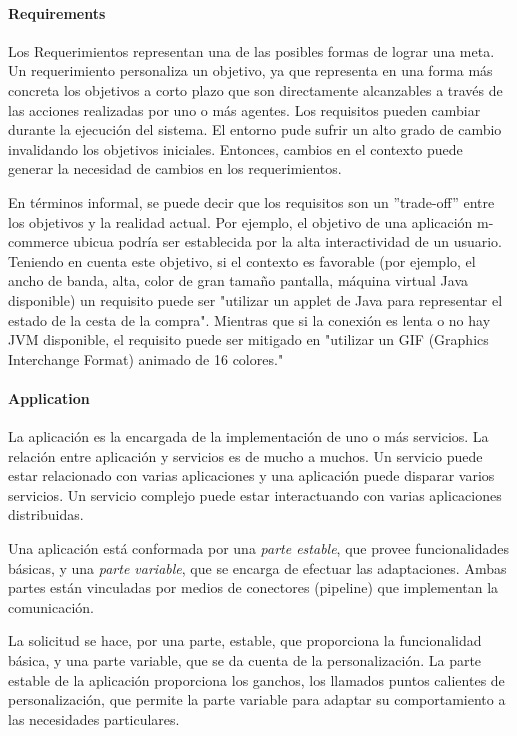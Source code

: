 \paragraph{Requirements}

Los Requerimientos representan una de las posibles formas de lograr una meta. Un requerimiento personaliza un objetivo, ya
que representa en una forma más concreta los objetivos a corto plazo que son directamente alcanzables a través de las acciones realizadas por uno o más agentes. Los requisitos pueden cambiar durante la ejecución del sistema. El entorno pude sufrir un alto grado de cambio invalidando los objetivos iniciales. Entonces, cambios en el contexto puede generar la necesidad de cambios en los requerimientos.

En términos informal, se puede decir que los requisitos son un ''trade-off'' entre los  objetivos y la realidad actual. Por ejemplo, el objetivo de una aplicación m-commerce ubicua podría ser establecida por la alta interactividad de un
usuario. Teniendo en cuenta este objetivo, si el contexto es favorable (por ejemplo, el ancho de banda, alta,
color de gran tamaño pantalla, máquina virtual Java disponible) un requisito puede ser "utilizar un
applet de Java para representar el estado de la cesta de la compra".  Mientras que si la conexión es lenta o no hay JVM disponible, el requisito puede ser mitigado en "utilizar un GIF (Graphics Interchange Format) animado de 16 colores."

\paragraph{Application}

La aplicación es la encargada de la implementación de uno o más servicios. La relación entre aplicación y servicios es de mucho a muchos. Un servicio puede estar relacionado con varias aplicaciones y una aplicación puede disparar varios servicios. Un servicio complejo puede estar interactuando con varias aplicaciones distribuidas. 

Una aplicación está conformada por una \textit{parte estable}, que provee funcionalidades básicas, y una \textit{parte variable}, que se encarga de efectuar las adaptaciones. Ambas partes están vinculadas por medios de
conectores (pipeline) que implementan la comunicación.


La solicitud se hace, por una parte, estable, que proporciona la funcionalidad básica, y una parte variable, que se da cuenta de la personalización. La parte estable de la aplicación proporciona los ganchos, los llamados puntos calientes de personalización, que permite la parte variable para adaptar su comportamiento a las necesidades particulares.


